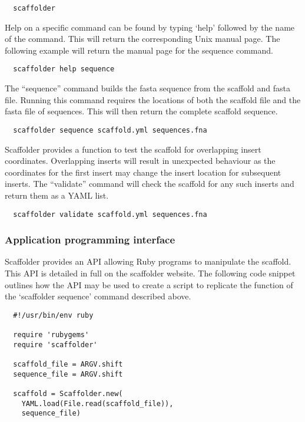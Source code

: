\documentclass[10pt]{bmc_article}
\newenvironment{bmcformat}{\begin{raggedright}\baselineskip20pt\sloppy\setboolean{publ}{false}}{\end{raggedright}\baselineskip20pt\sloppy}
\begin{document}
\begin{bmcformat}
\begin{verbatim}
  scaffolder
\end{verbatim}

Help on a specific command can be found by typing `help' followed by the name
of the command. This will return the corresponding Unix manual page. The
following example will return the manual page for the sequence command. \pb

\begin{verbatim}
  scaffolder help sequence
\end{verbatim} 

The ``sequence'' command builds the fasta sequence from the scaffold and fasta
file. Running this command requires the locations of both the scaffold file and
the fasta file of sequences. This will then return the complete scaffold
sequence. \pb

\begin{verbatim}
  scaffolder sequence scaffold.yml sequences.fna
\end{verbatim}

Scaffolder provides a function to test the scaffold for overlapping insert
coordinates. Overlapping inserts will result in unexpected behaviour as the
coordinates for the first insert may change the insert location for subsequent
inserts. The ``validate'' command will check the scaffold for any such inserts
and return them as a YAML list. \pb

\begin{verbatim}
  scaffolder validate scaffold.yml sequences.fna
\end{verbatim}

\subsubsection*{Application programming interface} %

Scaffolder provides an API allowing Ruby programs to manipulate the scaffold.
This API is detailed in full on the scaffolder website. The following code
snippet outlines how the API may be used to create a script to replicate the
function of the `scaffolder sequence' command described above. \pb

\begin{verbatim}
  #!/usr/bin/env ruby

  require 'rubygems'
  require 'scaffolder'

  scaffold_file = ARGV.shift
  sequence_file = ARGV.shift

  scaffold = Scaffolder.new(
    YAML.load(File.read(scaffold_file)),
    sequence_file)


\end{verbatim}
\end{bmcformat}
\end{document}
